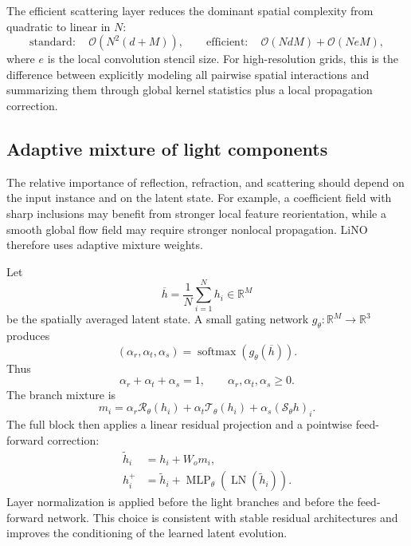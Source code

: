 \documentclass{article}
\newcommand{\R}{\mathbb{R}}
\newcommand{\cR}{\mathcal{R}}
\newcommand{\cT}{\mathcal{T}}
\newcommand{\cS}{\mathcal{S}}
\newcommand{\softmax}{\operatorname{softmax}}
\begin{document}
The efficient scattering layer reduces the dominant spatial complexity from quadratic to linear in $N$:
\begin{equation}
    \mathrm{standard:}\quad \mathcal{O}(N^2(d+M)),
    \qquad
    \mathrm{efficient:}\quad \mathcal{O}(NdM)+\mathcal{O}(NeM),
\end{equation}
where $e$ is the local convolution stencil size. For high-resolution grids, this is the difference between explicitly modeling all pairwise spatial interactions and summarizing them through global kernel statistics plus a local propagation correction.

\subsection{Adaptive mixture of light components}

The relative importance of reflection, refraction, and scattering should depend on the input instance and on the latent state. For example, a coefficient field with sharp inclusions may benefit from stronger local feature reorientation, while a smooth global flow field may require stronger nonlocal propagation. LiNO therefore uses adaptive mixture weights.

Let
\begin{equation}
    \overline h
    =
    \frac{1}{N}\sum_{i=1}^{N}h_i\in\R^M
    \label{eq:global-pool}
\end{equation}
be the spatially averaged latent state. A small gating network $g_\theta:\R^M\to\R^3$ produces
\begin{equation}
    (\alpha_r,\alpha_t,\alpha_s)
    =
    \softmax(g_\theta(\overline h)).
    \label{eq:gating}
\end{equation}
Thus
\begin{equation}
    \alpha_r+\alpha_t+\alpha_s=1,
    \qquad
    \alpha_r,\alpha_t,\alpha_s\ge 0.
\end{equation}
The branch mixture is
\begin{equation}
    m_i
    =
    \alpha_r\cR_\theta(h_i)
    +
    \alpha_t\cT_\theta(h_i)
    +
    \alpha_s(\cS_\theta h)_i.
    \label{eq:branch-mixture}
\end{equation}
The full block then applies a linear residual projection and a pointwise feed-forward correction:
\begin{align}
    \widetilde h_i &= h_i + W_o m_i,
    \label{eq:out-proj}\\
    h_i^+ &= \widetilde h_i + \operatorname{MLP}_\theta(\operatorname{LN}(\widetilde h_i)).
    \label{eq:ffn-correction}
\end{align}
Layer normalization is applied before the light branches and before the feed-forward network. This choice is consistent with stable residual architectures and improves the conditioning of the learned latent evolution.
\end{document}
